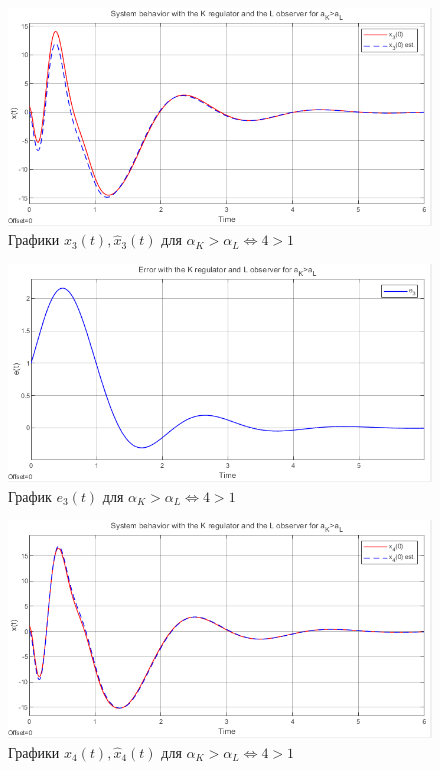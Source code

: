 \documentclass[a4paper, 12pt]{article}
\begin{document}
    \newpage
    \vspace*{20mm}
    \begin{figure}[H]
        \centering
        \includegraphics[scale=0.8]{2task_aKgaL_x3.png}
        \captionsetup{skip=0pt}
        \caption{Графики $x_3(t),\hat{x}_3(t)$ для $\alpha_K>\alpha_L\Leftrightarrow4>1$}
        \label{2task_aKgaL_x3}
    \end{figure}
    \begin{figure}[H]
        \centering
        \includegraphics[scale=0.8]{2task_aKgaL_e3.png}
        \captionsetup{skip=0pt}
        \caption{График $e_3(t)$ для $\alpha_K>\alpha_L\Leftrightarrow4>1$}
        \label{2task_aKgaL_e3}
    \end{figure}
    \newpage
    \vspace*{20mm}
    \begin{figure}[H]
        \centering
        \includegraphics[scale=0.8]{2task_aKgaL_x4.png}
        \captionsetup{skip=0pt}
        \caption{Графики $x_4(t),\hat{x}_4(t)$ для $\alpha_K>\alpha_L\Leftrightarrow4>1$}
        \label{2task_aKgaL_x4}
    \end{figure}
\end{document}

